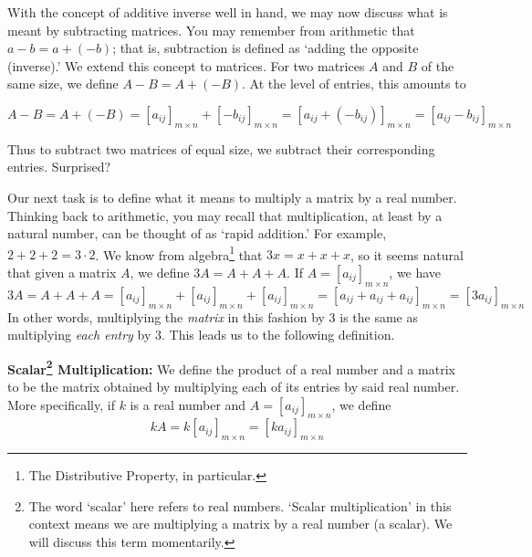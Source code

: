 \documentclass{ximera}
\begin{document}
With the concept of additive inverse well in hand, we may now discuss what is meant by subtracting matrices.  You may remember from arithmetic that $a - b = a+(-b)$;  that is, subtraction is defined as `adding the opposite (inverse).'  We extend this concept to matrices.  For two matrices $A$ and $B$  of the same size, we define $A-B = A + (-B)$.  At the level of entries, this amounts to

\[A-B = A + (-B) = \left[a_{ij}\right]_{m \times n} + \left[-b_{ij}\right]_{m \times n} = \left[a_{ij} + \left(-b_{ij}\right) \right]_{m \times n} = \left[a_{ij} - b_{ij} \right]_{m \times n}\]

Thus to subtract two matrices of equal size, we subtract their corresponding entries.  Surprised?


\smallskip

Our next task is to define what it means to multiply a matrix by a real number.  Thinking back to arithmetic,  you may recall that multiplication, at least by a natural number, can be thought of as `rapid addition.' For example,  $2+2+2 = 3 \cdot 2$.  We know from algebra\footnote{The Distributive Property, in particular.} that $3x = x + x + x$, so it seems natural that given a matrix $A$, we define $3A = A + A + A$.  If $A =\left[a_{ij}\right]_{m \times n}$, we have \[3A = A + A + A = \left[a_{ij}\right]_{m \times n} + \left[a_{ij}\right]_{m \times n} + \left[a_{ij}\right]_{m \times n} = \left[a_{ij} + a_{ij} + a_{ij} \right]_{m \times n} = \left[ 3a_{ij}\right]_{m \times n} \]  In other words, multiplying the \textit{matrix} in this fashion by $3$ is the same as multiplying \textit{each entry} by $3$.  This leads us to the following definition.  

\smallskip


\begin{definition} \label{scalarmultmatrix}  \textbf{Scalar\footnote{The word `scalar' here refers to real numbers.  `Scalar multiplication' in this context means we are multiplying a matrix by a real number (a scalar).  We will discuss this term momentarily.} Multiplication:} We define the product of a real number and a matrix to be the matrix obtained by multiplying each of its entries by said real number.  More specifically, if $k$ is a real number and $A = \left[a_{ij}\right]_{m \times n}$, we define \[kA = k\left[a_{ij}\right]_{m \times n} = \left[ka_{ij}\right]_{m \times n}\]

\end{definition}
\end{document}
